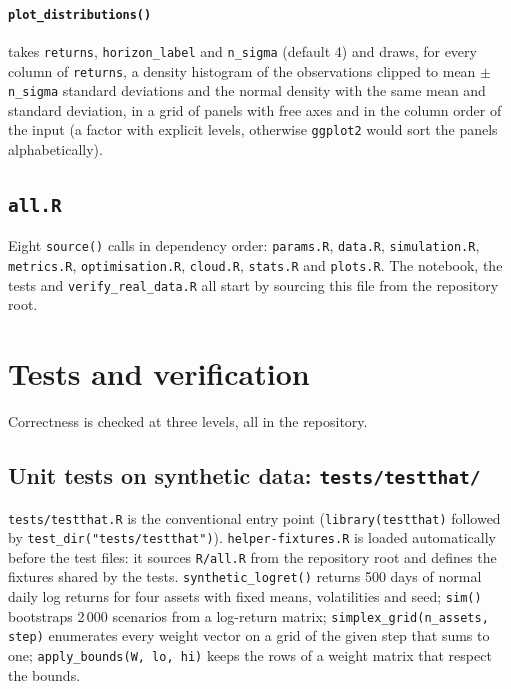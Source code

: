 \documentclass[11pt,a4paper]{article}
\newcommand{\code}[1]{\texttt{#1}}
\newcommand{\file}[1]{\texttt{#1}}
\theoremstyle{plain}
\theoremstyle{remark}
\begin{document}
\paragraph{\code{plot\_distributions()}} takes \code{returns}, \code{horizon\_label} and \code{n\_sigma} (default 4) and draws, for every column of \code{returns}, a density histogram of the
observations clipped to mean $\pm$ \code{n\_sigma} standard deviations and
the normal density with the same mean and standard deviation, in a grid of
panels with free axes and in the column order of the input (a factor with
explicit levels, otherwise \code{ggplot2} would sort the panels
alphabetically).

\subsection{\file{all.R}}

Eight \code{source()} calls in dependency order: \file{params.R},
\file{data.R}, \file{simulation.R}, \file{metrics.R},
\file{optimisation.R}, \file{cloud.R}, \file{stats.R} and
\file{plots.R}. The notebook, the tests and
\file{verify\_real\_data.R} all start by sourcing this file from the
repository root.

\section{Tests and verification}
\label{sec:code-tests}

Correctness is checked at three levels, all in the repository.

\subsection{Unit tests on synthetic data: \file{tests/testthat/}}

\file{tests/testthat.R} is the conventional entry point
(\code{library(testthat)} followed by \code{test\_dir("tests/testthat")}).
\file{helper-fixtures.R} is loaded automatically before the test files: it
sources \file{R/all.R} from the repository root and defines the fixtures
shared by the tests. \code{synthetic\_logret()} returns 500 days of normal
daily log returns for four assets with fixed means, volatilities and seed;
\code{sim()} bootstraps 2\,000 scenarios from a log-return matrix;
\code{simplex\_grid(n\_assets, step)} enumerates every weight vector on a grid of
the given step that sums to one; \code{apply\_bounds(W, lo, hi)} keeps the
rows of a weight matrix that respect the bounds.
\end{document}
